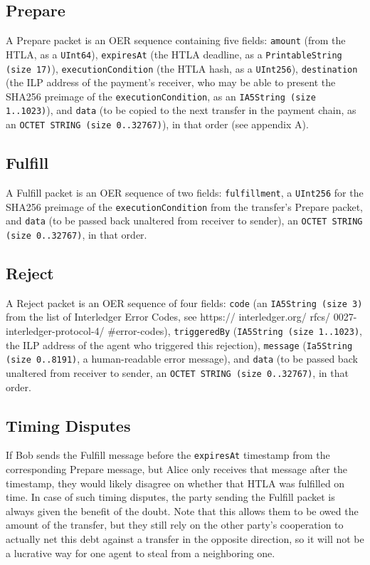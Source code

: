\documentclass[11pt,twoside,a4paper]{article}
\begin{document}
\subsection{Prepare}
A Prepare packet is an OER sequence containing five fields:
{\tt amount} (from the HTLA, as a {\tt UInt64}),
{\tt expiresAt} (the HTLA deadline, as a {\tt PrintableString (size 17)}),
{\tt executionCondition} (the HTLA hash, as a {\tt UInt256}),
{\tt destination} (the ILP address of the payment's receiver, who may be able to present the SHA256 preimage of the {\tt executionCondition}, as an {\tt IA5String (size 1..1023)}), and
{\tt data} (to be copied to the next transfer in the payment chain, as an {\tt OCTET STRING (size 0..32767)}),
in that order (see appendix A).

\subsection{Fulfill}
A Fulfill packet is an OER sequence of two fields:
{\tt fulfillment}, a {\tt UInt256} for the SHA256 preimage of the {\tt executionCondition} from the transfer's Prepare packet,
and {\tt data} (to be passed back unaltered from receiver to sender), an {\tt OCTET STRING (size 0..32767)}, in that order.

\subsection{Reject}
A Reject packet is an OER sequence of four fields:
{\tt code} (an {\tt IA5String (size 3)} from the list of Interledger Error Codes, see https:// interledger.org/ rfcs/ 0027-interledger-protocol-4/ \#error-codes),
{\tt triggeredBy} ({\tt IA5String (size 1..1023)}, the ILP address of the agent who triggered this rejection),
{\tt message} ({\tt Ia5String (size 0..8191)}, a human-readable error message),
and {\tt data} (to be passed back unaltered from receiver to sender, an {\tt OCTET STRING (size 0..32767)}, in that order.

\subsection{Timing Disputes}
If Bob sends the Fulfill message before the {\tt expiresAt} timestamp from the corresponding Prepare message, but Alice only receives that message after the
timestamp, they would likely disagree on whether that HTLA was fulfilled on time. In case of such timing disputes, the party sending the Fulfill
packet is always given the benefit of the doubt. Note that this allows them to be owed the amount of the transfer, but they still rely on the other party's
cooperation to actually net this debt against a transfer in the opposite direction, so it will not be a lucrative way for one agent to steal from a neighboring one.
\end{document}
